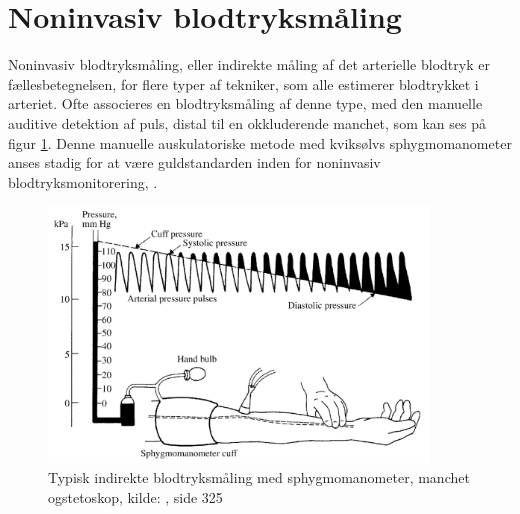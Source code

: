 \section{Noninvasiv blodtryksmåling}\label{noninvasivBloodpressureMeasurement}
Noninvasiv blodtryksmåling, eller indirekte måling af det arterielle blodtryk er fællesbetegnelsen, for flere typer af tekniker, som alle estimerer blodtrykket i arteriet. Ofte associeres en blodtryksmåling af denne type, med den manuelle auditive detektion af puls, distal til en okkluderende manchet, som kan ses på figur \ref{fig:audiotoryBloodpressureMeasurement}. Denne manuelle auskulatoriske metode med kviksølvs sphygmomanometer anses stadig for at være guldstandarden inden for noninvasiv blodtryksmonitorering, \cite{RefWorks:24} .

\begin{figure}[H]
	\centering
	\includegraphics[width=0.9\textwidth]{billeder/TypicalIndirectBlood-pressureMeasurement.png}
	\caption{Typisk indirekte blodtryksmåling med sphygmomanometer, manchet ogstetoskop, kilde: \cite{RefWorks:27}, side 325}\label{fig:audiotoryBloodpressureMeasurement}
\end{figure}

